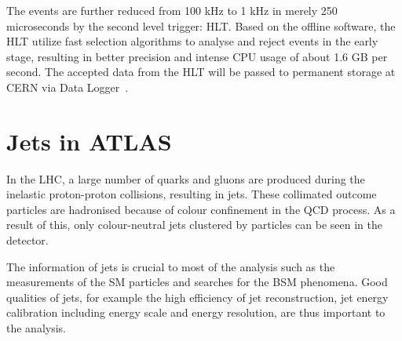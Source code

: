 \documentclass[UTF8,12pt]{ctexart}
\numberwithin{equation}{section}
\begin{document}
The events are further reduced from 100 kHz to 1 kHz in merely 250 microseconds by the second level trigger: HLT. Based on the offline software, the HLT utilize fast selection algorithms to analyse and reject events in the early stage, resulting in better precision and intense CPU usage of about 1.6 GB per second.  The accepted data from the HLT will be passed to permanent storage at CERN via Data Logger~\cite{ATL-SOFT-PUB-2021-001}. 



\newpage
{}
\section{Jets in ATLAS}
\label{sec:4}


In the LHC, a large number of quarks and gluons are produced during the inelastic proton-proton collisions, resulting in jets. These collimated outcome particles are hadronised because of colour confinement in the QCD process. As a result of this, only colour-neutral jets clustered by particles can be seen in the detector.

The information of jets is crucial to most of the analysis such as the measurements of the SM particles and searches for the BSM phenomena. Good qualities of jets, for example the high efficiency of jet reconstruction, jet energy calibration including energy scale and energy resolution, are thus important to the analysis.





\end{document}
